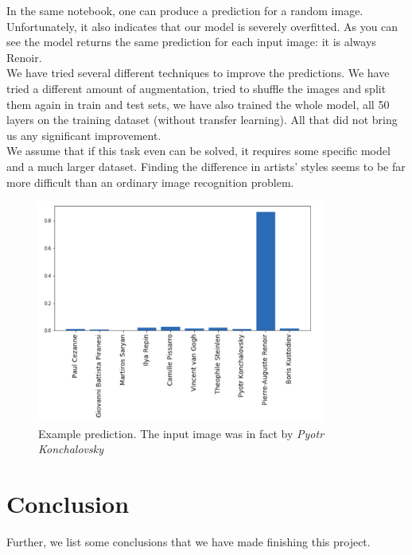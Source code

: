 \documentclass[
	12pt, %
]{fphw}
\begin{document}
\pagebreak
In the same notebook, one can produce a prediction for a random image. Unfortunately, it also indicates that our model is severely overfitted.  As you can see the model returns the same prediction for each input image: it is always Renoir.\\

We have tried several different techniques to improve the predictions. We have tried a different amount of augmentation, tried to shuffle the images and split them again in train and test sets, we have also trained the whole model, all 50 layers on the training dataset (without transfer learning). All that did not bring us any significant improvement.\\

We assume that if this task even can be solved, it requires some specific model and a much larger dataset. Finding the difference in artists' styles seems to be far more difficult than an ordinary image recognition problem. 

\begin{figure}[H]
	\center \includegraphics[width=0.85\textwidth]{prediction}
	\caption{Example prediction. The input image was in fact by \textit{Pyotr Konchalovsky}}
\end{figure}

 
\pagebreak
\section{Conclusion}

Further, we list some conclusions that we have made finishing this project.
\end{document}

